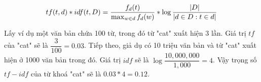 \begin{equation}
tf(t, d) * idf(t, D) = \dfrac{f_d(t)}{\max_{w \in d} f_d(w)} * \log{\dfrac{|D|}{|d \in D : t \in d|}}\\\\\\
\end{equation}

Lấy ví dụ một văn bản chứa 100 từ, trong đó từ "cat" xuất hiện 3 lần. Giá trị $tf$ của "cat" sẽ là   $\dfrac{3}{100} = 0.03$. Tiếp theo, giả dụ có 10 triệu văn bản và từ "cat" xuất hiện ở 1000 văn bản trong đó. Giá trị $idf$ sẽ là $\log{\dfrac{10,000,000}{1,000}} = 4$. Vậy trọng số $tf-idf$ của từ khoá "cat" sẽ là $0.03 * 4 = 0.12$.
